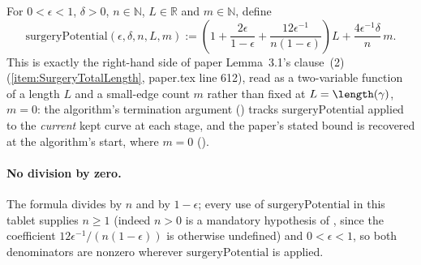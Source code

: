 \begin{definition}
  \label{surgery-potential}
  For $0<\epsilon<1$, $\delta>0$, $n \in \mathbb{N}$, $L \in \mathbb{R}$ and $m \in \mathbb{N}$,
  define
  \[
    \mathrm{surgeryPotential}(\epsilon,\delta,n,L,m) :=
    \left( 1 + \frac{2\epsilon}{1-\epsilon} + \frac{12\epsilon^{-1}}{n(1-\epsilon)} \right) L
    + \frac{4\epsilon^{-1}\delta}{n} \, m
    .
  \]
  This is exactly the right-hand side of paper Lemma~3.1's clause~(2)
  (\eqref{item:SurgeryTotalLength}, paper.tex line 612), read as a two-variable function of a
  length $L$ and a small-edge count $m$ rather than fixed at $L=\length(\gamma)$, $m=0$: the
  algorithm's termination argument () tracks
  $\mathrm{surgeryPotential}$ applied to the \emph{current} kept curve at each stage, and the
  paper's stated bound is recovered at the algorithm's start, where $m=0$
  ().

  \paragraph{No division by zero.} The formula divides by $n$ and by $1-\epsilon$; every use of
  $\mathrm{surgeryPotential}$ in this tablet supplies $n\ge1$ (indeed $n>0$ is a mandatory
  hypothesis of , since the coefficient
  $12\epsilon^{-1}/(n(1-\epsilon))$ is otherwise undefined) and $0<\epsilon<1$, so both
  denominators are nonzero wherever $\mathrm{surgeryPotential}$ is applied.
\end{definition}
